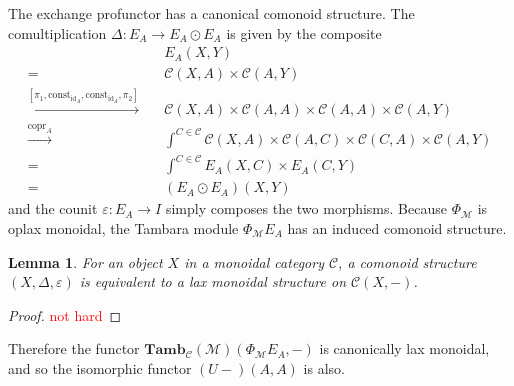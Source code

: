 \documentclass[11pt,a4paper]{article}
\theoremstyle{plain}
\newtheorem{lemma}[theorem]{Lemma}
\theoremstyle{definition}
\newcommand{\C}{\mathscr{C}}
\newcommand{\M}{\mathscr{M}}
\newcommand{\Pastro}{\Phi}
\newcommand{\Tamb}{\mathbf{Tamb}}
\newcommand{\id}{\mathrm{id}}
\newcommand{\const}{\mathrm{const}}
\DeclareMathOperator{\copr}{copr}
\newcommand{\todo}[1]{\textcolor{red}{\small #1}}
\begin{document}
The exchange profunctor has a canonical comonoid structure. The comultiplication $\Delta : E_A \to E_A \odot E_A$ is given by the composite
\begin{align*}
&E_A(X,Y) \\
= \quad& \C(X, A) \times \C(A, Y) \\
\xrightarrow{[\pi_1, \const_{\id_A}, \const_{\id_A}, \pi_2]} \quad& \C(X, A) \times \C(A, A) \times \C(A, A) \times \C(A, Y) \\
\xrightarrow{\copr_A} \quad& \int^{C \in \C} \C(X, A) \times \C(A, C) \times \C(C, A) \times \C(A, Y) \\
= \quad& \int^{C \in \C} E_A(X,C) \times E_A(C,Y) \\
= \quad&  (E_A \odot E_A)(X,Y)
\end{align*}
and the counit $\varepsilon : E_A \to I$ simply composes the two morphisms. Because $\Pastro_\M$ is oplax monoidal, the Tambara module $\Pastro_\M E_A$ has an induced comonoid structure.

\begin{lemma}
For an object $X$ in a monoidal category $\C$, a comonoid structure $(X,\Delta,\varepsilon)$ is equivalent to a lax monoidal structure on $\C(X, -)$.
\end{lemma}
\begin{proof}
\todo{not hard}
\end{proof}

Therefore the functor $\Tamb_\C(\M)(\Pastro_\M E_A, -)$ is canonically lax monoidal, and so the isomorphic functor $(U-)(A,A)$ is also.
\end{document}
